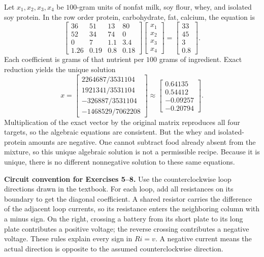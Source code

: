 Let $x_1,x_2,x_3,x_4$ be $100$-gram units of nonfat milk, soy flour,
whey, and isolated soy protein. In the row order protein,
carbohydrate, fat, calcium, the equation is
\[
 \begin{bmatrix}
 36&51&13&80\\52&34&74&0\\0&7&1.1&3.4\\1.26&0.19&0.8&0.18
 \end{bmatrix}
 \begin{bmatrix}x_1\\x_2\\x_3\\x_4\end{bmatrix}
 =\begin{bmatrix}33\\45\\3\\0.8\end{bmatrix}.
\]
Each coefficient is grams of that nutrient per $100$ grams of ingredient.
Exact reduction yields the unique solution
\[
 x=\begin{bmatrix}
 2264687/3531104\\1921341/3531104\\-326887/3531104\\-1468529/7062208
 \end{bmatrix}
 \approx\begin{bmatrix}0.64135\\0.54412\\-0.09257\\-0.20794\end{bmatrix}.
\]
Multiplication of the exact vector by the original matrix reproduces
all four targets, so the algebraic equations are consistent. But the
whey and isolated-protein amounts are negative. One cannot subtract
food already absent from the mixture, so this unique algebraic solution
is not a permissible recipe. Because it is unique, there is no different
nonnegative solution to these same equations.

\textbf{Circuit convention for Exercises 5--8.}
Use the counterclockwise loop directions drawn in the textbook.
For each loop, add all resistances on its boundary to get the diagonal
coefficient. A shared resistor carries the difference of the adjacent
loop currents, so its resistance enters the neighboring column with a
minus sign. On the right, crossing a battery from its short plate to
its long plate contributes a positive voltage; the reverse crossing
contributes a negative voltage. These rules explain every sign in
$Ri=v$. A negative current means the actual direction is opposite
to the assumed counterclockwise direction.



